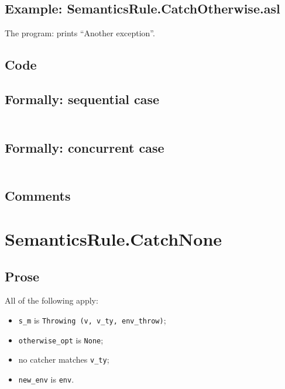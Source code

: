 \documentclass{book}
\begin{document}
    \subsection{Example: SemanticsRule.CatchOtherwise.asl}
     The program:
     prints ``Another exception''.

  \subsection{Code}

  \subsection{Formally: sequential case}
  \begin{align}
  \end{align} 

  \subsection{Formally: concurrent case}
  \begin{align}
  \end{align} 

    \subsection{Comments}

\section{SemanticsRule.CatchNone \label{sec:SemanticsRule.CatchNone}}

    \subsection{Prose}
    All of the following apply:
    \begin{itemize}
    \item \texttt{s\_m} is \texttt{Throwing (v, v\_ty, env\_throw)};
    \item \texttt{otherwise\_opt} is \texttt{None};
    \item no catcher matches \texttt{v\_ty};
    \item \texttt{new\_env} is \texttt{env}.
    \end{itemize}
\end{document}
